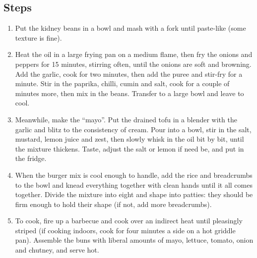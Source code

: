 \documentclass{book}
\begin{document}
\subsection*{Steps}
\begin{enumerate}
\item Put the kidney beans in a bowl and mash with a fork until paste-like (some texture is fine).
\item Heat the oil in a large frying pan on a medium flame, then fry the onions and peppers for 15 minutes, stirring often, until the onions are soft and browning. Add the garlic, cook for two minutes, then add the puree and stir-fry for a minute. Stir in the paprika, chilli, cumin and salt, cook for a couple of minutes more, then mix in the beans. Transfer to a large bowl and leave to cool.
\item Meanwhile, make the “mayo”. Put the drained tofu in a blender with the garlic and blitz to the consistency of cream. Pour into a bowl, stir in the salt, mustard, lemon juice and zest, then slowly whisk in the oil bit by bit, until the mixture thickens. Taste, adjust the salt or lemon if need be, and put in the fridge.
\item When the burger mix is cool enough to handle, add the rice and breadcrumbs to the bowl and knead everything together with clean hands until it all comes together. Divide the mixture into eight and shape into patties: they should be firm enough to hold their shape (if not, add more breadcrumbs).
\item To cook, fire up a barbecue and cook over an indirect heat until pleasingly striped (if cooking indoors, cook for four minutes a side on a hot griddle pan). Assemble the buns with liberal amounts of mayo, lettuce, tomato, onion and chutney, and serve hot.
\end{enumerate}
\newpage
\end{document}
